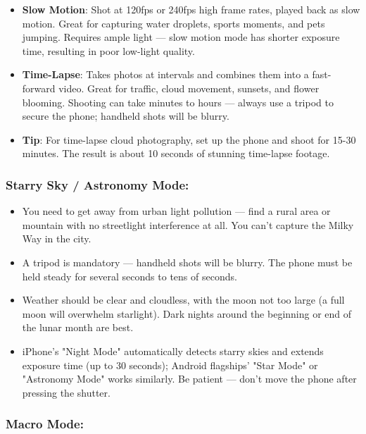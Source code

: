 \begin{itemize}
  \item \textbf{Slow Motion}: Shot at 120fps or 240fps high frame rates, played back as slow motion. Great for capturing water droplets, sports moments, and pets jumping. Requires ample light — slow motion mode has shorter exposure time, resulting in poor low-light quality.
  \item \textbf{Time-Lapse}: Takes photos at intervals and combines them into a fast-forward video. Great for traffic, cloud movement, sunsets, and flower blooming. Shooting can take minutes to hours — always use a tripod to secure the phone; handheld shots will be blurry.
  \item \textbf{Tip}: For time-lapse cloud photography, set up the phone and shoot for 15-30 minutes. The result is about 10 seconds of stunning time-lapse footage.
\end{itemize}

\subsubsection*{Starry Sky / Astronomy Mode:}

\begin{itemize}
  \item You need to get away from urban light pollution — find a rural area or mountain with no streetlight interference at all. You can't capture the Milky Way in the city.
  \item A tripod is mandatory — handheld shots will be blurry. The phone must be held steady for several seconds to tens of seconds.
  \item Weather should be clear and cloudless, with the moon not too large (a full moon will overwhelm starlight). Dark nights around the beginning or end of the lunar month are best.
  \item iPhone's "Night Mode" automatically detects starry skies and extends exposure time (up to 30 seconds); Android flagships' "Star Mode" or "Astronomy Mode" works similarly. Be patient — don't move the phone after pressing the shutter.
\end{itemize}

\subsubsection*{Macro Mode:}


